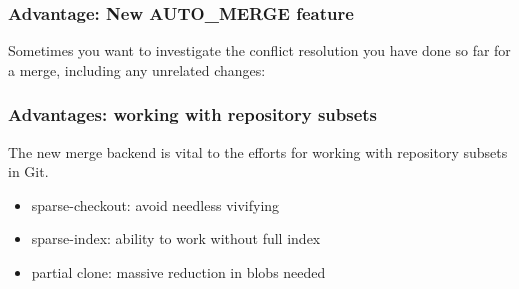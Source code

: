 \documentclass[compress,t]{beamer}
\begin{document}
\begin{frame}[fragile]
  \frametitle{Advantage: New AUTO\_MERGE feature}

  Sometimes you want to investigate the conflict resolution you have
  done so far for a merge, including any unrelated changes:\\
  \vspace*{\baselineskip}
  \qquad{}

  \begin{comment}
  ALTERNATE:

  There are a variety of questions users might ask while resolving
  conflicts:
  \vspace*{-\baselineskip}
  \begin{enumerate}
    \item What changes have been made since the previous (first) parent?
    \item What changes are staged?
    \item What is still unstaged? (or what is still conflicted?)
    \item What changes did I make to resolve conflicts so far?
  \end{enumerate}

  \vspace*{\baselineskip}
  The first three of these have simple answers:
  \begin{enumerate}
    \item \texttt{git diff HEAD}
    \item \texttt{git diff {-}{-}cached}
    \item \texttt{git diff}
  \end{enumerate}

  Due to the new merge strategy, the fourth now has an answer too:
  \begin{enumerate}[4]
    \item \texttt{git diff AUTO\_MERGE}
  \end{enumerate}
  \end{comment}

\end{frame}


\begin{frame}
  \frametitle{Advantages: working with repository subsets}

  The new merge backend is vital to the efforts for working with
  repository subsets in Git.
  \begin{itemize}
    \item sparse-checkout: avoid needless vivifying
    \item sparse-index: ability to work without full index
    \item partial clone: massive reduction in blobs needed
  \end{itemize}

\end{frame}
\end{document}
